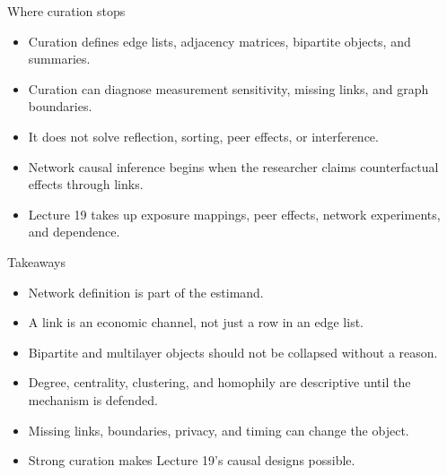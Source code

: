 \documentclass[aspectratio=169,11pt]{beamer}
\newcommand{\1}{\mathbf{1}}
\begin{document}
\begin{frame}{Where curation stops}
\begin{itemize}
    \item Curation defines edge lists, adjacency matrices, bipartite objects, and summaries.
    \item Curation can diagnose measurement sensitivity, missing links, and graph boundaries.
    \item It does not solve reflection, sorting, peer effects, or interference.
    \item Network causal inference begins when the researcher claims counterfactual effects through links.
    \item Lecture 19 takes up exposure mappings, peer effects, network experiments, and dependence.
\end{itemize}
\end{frame}

\begin{frame}{Takeaways}
\begin{itemize}
    \item Network definition is part of the estimand.
    \item A link is an economic channel, not just a row in an edge list.
    \item Bipartite and multilayer objects should not be collapsed without a reason.
    \item Degree, centrality, clustering, and homophily are descriptive until the mechanism is defended.
    \item Missing links, boundaries, privacy, and timing can change the object.
    \item Strong curation makes Lecture 19's causal designs possible.
\end{itemize}
\end{frame}
\end{document}
